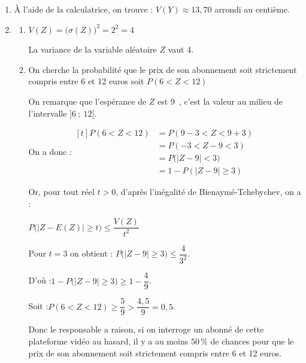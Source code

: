 \documentclass[10pt]{article}
\providecommand{\euro}{\texteuro}
\providecommand{\euro}{{\text{€}}}
\renewcommand{\euro}{\ifmmode\text{\texteuro}\else\texteuro\fi}
\begin{document}
\begin{enumerate}
\item À l'aide de la calculatrice, on trouve : $V(Y) \approx 13,70$ arrondi au centième.


\item
	\begin{enumerate}
		\item $V(Z) = \big(\sigma(Z)\big)^2= 2^2 =4$

La variance de la variable aléatoire $Z$ vaut 4.
		\item On cherche la probabilité que le prix de son abonnement soit strictement compris entre 6 et 12 euros soit $P(6 < Z <12)$

On remarque que l'espérance de $Z$ est $9$~\euro{}, c'est la valeur au milieu de l'intervalle $]6~;~12[$.

On a donc :\quad $\begin{aligned}[t]
	P(6 < Z <12)
	&= P(9-3<Z<9+3) \\
	&= P(-3 < Z-9 < 3)\\
	&= P\Big(\big|Z-9\big| < 3\Big)\\
	&= 1 - P(|Z-9|\geqslant 3)
\end{aligned}$

Or, pour tout réel $t > 0$, d'après l'inégalité de Bienaymé-Tchebychev, on a :

$P\Big(\big|Z-E(Z)\big| \geqslant t\Big) \leqslant \dfrac{V(Z)}{t^2}$

Pour $t = 3$ on obtient : \quad $ P\Big(\big|Z-9\big| \geqslant 3\Big)\leqslant \dfrac{4}{ 3^2}$.

D'où :\quad $1- P\Big(\big|Z-9\big| \geqslant 3\Big)\geqslant 1- \dfrac{4}{9}$.

Soit :\quad $P(6 <Z <12) \geqslant \dfrac{5}{9} > \dfrac{4,5}{9} = 0,5$.

Donc le responsable a raison, si on interroge un abonné de cette plateforme vidéo au hasard, il y a au moins $50\,\%$ de chances pour que le prix de son abonnement soit strictement compris entre 6 et 12 euros.
	\end{enumerate}
\end{enumerate}
\end{document}
